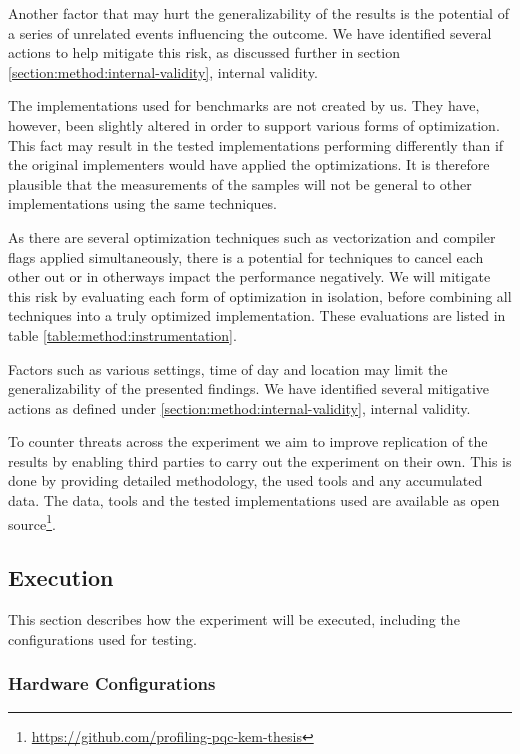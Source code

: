 Another factor that may hurt the generalizability of the results is the potential of a series of unrelated events influencing the outcome. We have identified several actions to help mitigate this risk, as discussed further in section \ref{section:method:internal-validity}, internal validity.

The implementations used for benchmarks are not created by us. They have, however, been slightly altered in order to support various forms of optimization. This fact may result in the tested implementations performing differently than if the original implementers would have applied the optimizations. It is therefore plausible that the measurements of the samples will not be general to other implementations using the same techniques.

As there are several optimization techniques such as vectorization and compiler flags applied simultaneously, there is a potential for techniques to cancel each other out or in otherways impact the performance negatively. We will mitigate this risk by evaluating each form of optimization in isolation, before combining all techniques into a truly optimized implementation. These evaluations are listed in table \ref{table:method:instrumentation}.

Factors such as various settings, time of day and location may limit the generalizability of the presented findings. We have identified several mitigative actions as defined under \ref{section:method:internal-validity}, internal validity.

To counter threats across the experiment we aim to improve replication of the results by enabling third parties to carry out the experiment on their own. This is done by providing detailed methodology, the used tools and any accumulated data. The data, tools and the tested implementations used are available as open source\footnote{\href{https://github.com/profiling-pqc-kem-thesis}{https://github.com/profiling-pqc-kem-thesis}}.

\subsection{Execution}

This section describes how the experiment will be executed, including the configurations used for testing.

\subsubsection{Hardware Configurations}

